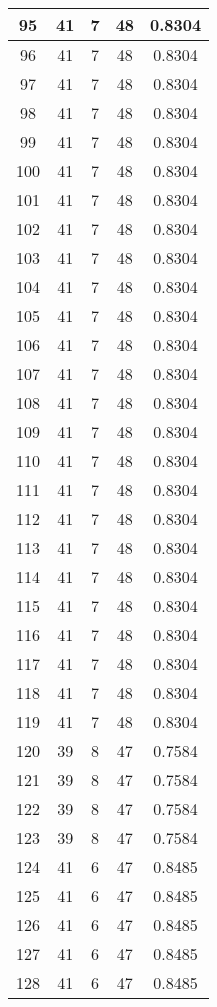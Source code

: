 \documentclass[letterpaper, 12pt]{article}
\begin{document}
\begin{longtable}{|c|c|c|c|c|}
95 & 41 & 7 & 48 & 0.8304 \\
\hline
96 & 41 & 7 & 48 & 0.8304 \\
\hline
97 & 41 & 7 & 48 & 0.8304 \\
\hline
98 & 41 & 7 & 48 & 0.8304 \\
\hline
99 & 41 & 7 & 48 & 0.8304 \\
\hline
100 & 41 & 7 & 48 & 0.8304 \\
\hline
101 & 41 & 7 & 48 & 0.8304 \\
\hline
102 & 41 & 7 & 48 & 0.8304 \\
\hline
103 & 41 & 7 & 48 & 0.8304 \\
\hline
104 & 41 & 7 & 48 & 0.8304 \\
\hline
105 & 41 & 7 & 48 & 0.8304 \\
\hline
106 & 41 & 7 & 48 & 0.8304 \\
\hline
107 & 41 & 7 & 48 & 0.8304 \\
\hline
108 & 41 & 7 & 48 & 0.8304 \\
\hline
109 & 41 & 7 & 48 & 0.8304 \\
\hline
110 & 41 & 7 & 48 & 0.8304 \\
\hline
111 & 41 & 7 & 48 & 0.8304 \\
\hline
112 & 41 & 7 & 48 & 0.8304 \\
\hline
113 & 41 & 7 & 48 & 0.8304 \\
\hline
114 & 41 & 7 & 48 & 0.8304 \\
\hline
115 & 41 & 7 & 48 & 0.8304 \\
\hline
116 & 41 & 7 & 48 & 0.8304 \\
\hline
117 & 41 & 7 & 48 & 0.8304 \\
\hline
118 & 41 & 7 & 48 & 0.8304 \\
\hline
119 & 41 & 7 & 48 & 0.8304 \\
\hline
120 & 39 & 8 & 47 & 0.7584 \\
\hline
121 & 39 & 8 & 47 & 0.7584 \\
\hline
122 & 39 & 8 & 47 & 0.7584 \\
\hline
123 & 39 & 8 & 47 & 0.7584 \\
\hline
124 & 41 & 6 & 47 & 0.8485 \\
\hline
125 & 41 & 6 & 47 & 0.8485 \\
\hline
126 & 41 & 6 & 47 & 0.8485 \\
\hline
127 & 41 & 6 & 47 & 0.8485 \\
\hline
128 & 41 & 6 & 47 & 0.8485 \\

\end{longtable}
\end{document}
